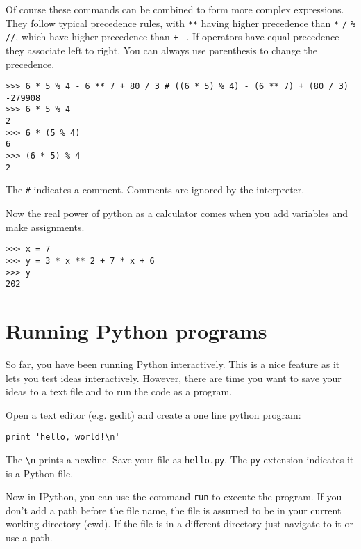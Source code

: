 \documentclass[12pt]{article}
\begin{document}

Of course these commands can be combined to form more complex expressions. They follow typical precedence rules, with \texttt{**} having higher precedence than \texttt{*} \texttt{/} \texttt{\%} \texttt{//}, which have higher precedence than \texttt{+} \texttt{-}. If operators have equal precedence they associate left to right. You can always use parenthesis to change the precedence.

\begin{lstlisting}[style=bash]
>>> 6 * 5 % 4 - 6 ** 7 + 80 / 3 # ((6 * 5) % 4) - (6 ** 7) + (80 / 3)
-279908
>>> 6 * 5 % 4
2
>>> 6 * (5 % 4)
6
>>> (6 * 5) % 4
2
\end{lstlisting}

The \texttt{\#} indicates a comment. Comments are ignored by the interpreter.

Now the real power of python as a calculator comes when you add variables and make assignments.

\begin{lstlisting}[style=bash]
>>> x = 7
>>> y = 3 * x ** 2 + 7 * x + 6
>>> y
202
\end{lstlisting}


\section{Running Python programs} 

So far, you have been running Python interactively. This is a nice feature as it lets you test ideas interactively. However, there are time you want to save your ideas to a text file and to run the code as a program.

Open a text editor (e.g. gedit) and create a one line python program:

\begin{lstlisting}[style=c]
print 'hello, world!\n'
\end{lstlisting}

The \texttt{\textbackslash n} prints a newline. Save your file as \texttt{hello.py}. The \texttt{py} extension indicates it is a Python file.


Now in IPython, you can use the command \texttt{run} to execute the program. If you don't add a path before the file name, the file is assumed to be in your current working directory (cwd). If the file is in a different directory just navigate to it or use a path.
\end{document}

